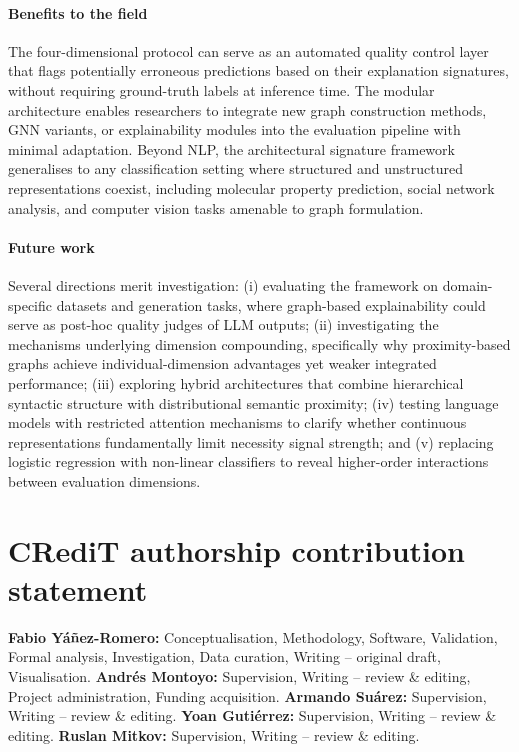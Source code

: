 \documentclass[preprint, times, review, 10pt]{elsarticle}
\begin{document}
\paragraph{\textbf{Benefits to the field}}
The four-dimensional protocol can serve as an automated quality control layer that flags potentially erroneous predictions based on their explanation signatures, without requiring ground-truth labels at inference time. The modular architecture enables researchers to integrate new graph construction methods, GNN variants, or explainability modules into the evaluation pipeline with minimal adaptation. Beyond NLP, the architectural signature framework generalises to any classification setting where structured and unstructured representations coexist, including molecular property prediction, social network analysis, and computer vision tasks amenable to graph formulation.

\paragraph{\textbf{Future work}}
Several directions merit investigation: (i) evaluating the framework on domain-specific datasets and generation tasks, where graph-based explainability could serve as post-hoc quality judges of LLM outputs; (ii) investigating the mechanisms underlying dimension compounding, specifically why proximity-based graphs achieve individual-dimension advantages yet weaker integrated performance; (iii) exploring hybrid architectures that combine hierarchical syntactic structure with distributional semantic proximity; (iv) testing language models with restricted attention mechanisms to clarify whether continuous representations fundamentally limit necessity signal strength; and (v) replacing logistic regression with non-linear classifiers to reveal higher-order interactions between evaluation dimensions.








\section*{CRediT authorship contribution statement}

\textbf{Fabio Y\'{a}\~{n}ez-Romero:} Conceptualisation, Methodology, Software, Validation, Formal analysis, Investigation, Data curation, Writing -- original draft, Visualisation.
\textbf{Andr\'{e}s Montoyo:} Supervision, Writing -- review \& editing, Project administration, Funding acquisition.
\textbf{Armando Su\'{a}rez:} Supervision, Writing -- review \& editing.
\textbf{Yoan Guti\'{e}rrez:} Supervision, Writing -- review \& editing.
\textbf{Ruslan Mitkov:} Supervision, Writing -- review \& editing.
\end{document}
